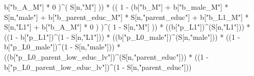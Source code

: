 \documentclass[
]{book}
\newenvironment{Shaded}{\begin{snugshade}}{\end{snugshade}}
\newcommand{\DecValTok}[1]{\textcolor[rgb]{0.00,0.00,0.81}{#1}}
\newcommand{\NormalTok}[1]{#1}
\newcommand{\SpecialCharTok}[1]{\textcolor[rgb]{0.00,0.00,0.00}{#1}}
\newcommand{\StringTok}[1]{\textcolor[rgb]{0.31,0.60,0.02}{#1}}
\begin{document}
\begin{Shaded}
\begin{Highlighting}[]
\NormalTok{           b[}\StringTok{"b\_A\_M"}\NormalTok{] }\SpecialCharTok{*} \DecValTok{0}\NormalTok{ )}\SpecialCharTok{\^{}}\NormalTok{( S[n,}\StringTok{"M"}\NormalTok{] )) }\SpecialCharTok{*}
\NormalTok{      (( }\DecValTok{1} \SpecialCharTok{{-}}\NormalTok{ (b[}\StringTok{"b\_M"}\NormalTok{] }\SpecialCharTok{+} 
\NormalTok{                b[}\StringTok{"b\_male\_M"}\NormalTok{] }\SpecialCharTok{*}\NormalTok{ S[n,}\StringTok{"male"}\NormalTok{] }\SpecialCharTok{+} 
\NormalTok{                b[}\StringTok{"b\_parent\_educ\_M"}\NormalTok{] }\SpecialCharTok{*}\NormalTok{ S[n,}\StringTok{"parent\_educ"}\NormalTok{] }\SpecialCharTok{+} 
\NormalTok{                b[}\StringTok{"b\_L1\_M"}\NormalTok{] }\SpecialCharTok{*}\NormalTok{ S[n,}\StringTok{"L1"}\NormalTok{] }\SpecialCharTok{+}
\NormalTok{                b[}\StringTok{"b\_A\_M"}\NormalTok{] }\SpecialCharTok{*} \DecValTok{0}\NormalTok{ ) )}\SpecialCharTok{\^{}}\NormalTok{( }\DecValTok{1} \SpecialCharTok{{-}}\NormalTok{ S[n,}\StringTok{"M"}\NormalTok{] )) }\SpecialCharTok{*}
\NormalTok{      ((b[}\StringTok{"p\_L1"}\NormalTok{])}\SpecialCharTok{\^{}}\NormalTok{(S[n,}\StringTok{"L1"}\NormalTok{])) }\SpecialCharTok{*}
\NormalTok{      ((}\DecValTok{1} \SpecialCharTok{{-}}\NormalTok{ b[}\StringTok{"p\_L1"}\NormalTok{])}\SpecialCharTok{\^{}}\NormalTok{(}\DecValTok{1} \SpecialCharTok{{-}}\NormalTok{ S[n,}\StringTok{"L1"}\NormalTok{])) }\SpecialCharTok{*}
\NormalTok{      ((b[}\StringTok{"p\_L0\_male"}\NormalTok{])}\SpecialCharTok{\^{}}\NormalTok{(S[n,}\StringTok{"male"}\NormalTok{])) }\SpecialCharTok{*} 
\NormalTok{      ((}\DecValTok{1} \SpecialCharTok{{-}}\NormalTok{ b[}\StringTok{"p\_L0\_male"}\NormalTok{])}\SpecialCharTok{\^{}}\NormalTok{(}\DecValTok{1} \SpecialCharTok{{-}}\NormalTok{ S[n,}\StringTok{"male"}\NormalTok{])) }\SpecialCharTok{*} 
\NormalTok{      ((b[}\StringTok{"p\_L0\_parent\_low\_educ\_lv"}\NormalTok{])}\SpecialCharTok{\^{}}\NormalTok{(S[n,}\StringTok{"parent\_educ"}\NormalTok{])) }\SpecialCharTok{*}
\NormalTok{      ((}\DecValTok{1} \SpecialCharTok{{-}}\NormalTok{ b[}\StringTok{"p\_L0\_parent\_low\_educ\_lv"}\NormalTok{])}\SpecialCharTok{\^{}}\NormalTok{(}\DecValTok{1} \SpecialCharTok{{-}}\NormalTok{ S[n,}\StringTok{"parent\_educ"}\NormalTok{])) }
    

\end{Highlighting}
\end{Shaded}
\end{document}
